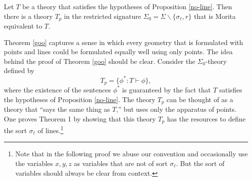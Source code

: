 \begin{thm}[Barrett] 
  Let $T$ be a theory that satisfies the hypotheses of Proposition
  \ref{no-line}. Then there is a theory $T_p$ in the restricted
  signature $\Sigma_0=\Sigma\backslash\{\sigma_\ell, r\}$ that is
  Morita equivalent to $T$. \label{goo}
\end{thm}

Theorem \ref{goo} captures a sense in which every geometry that is
formulated with points and lines could be formulated equally well
using only points. The idea behind the proof of Theorem \ref{goo}
should be clear. Consider the $\Sigma_0$-theory defined by
\[ 
  T_p=\{\phi^*: T\vdash\phi\},
\]
where the existence of the sentences $\phi^*$ is guaranteed by the
fact that $T$ satisfies the hypotheses of Proposition
\ref{no-line}. The theory $T_p$ can be thought of as a theory that
``says the same thing as $T$,'' but uses only the apparatus of
points. One proves Theorem 1 by showing that this theory $T_p$ has the
resources to define the sort $\sigma_\ell$ of lines.\footnote{Note
  that in the following proof we abuse our convention and occasionally
  use the variables $x,y,z$ as variables that are not of sort
  $\sigma_\ell$. But the sort of variables should always be clear from
  context.}

